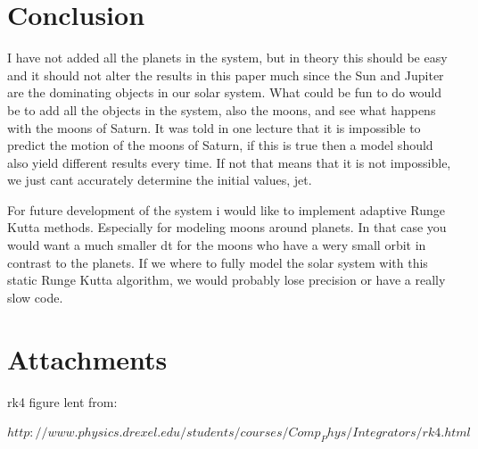 \documentclass[norsk,a4paper,12pt]{article}
\begin{document}
\section*{Conclusion}

I have not added all the planets in the system, but in theory this should be easy and it should not alter the results in this 
paper much since the Sun and Jupiter are the dominating objects in our solar system. What could be fun to do would be to add all
the objects in the system, also the moons, and see what happens with the moons of Saturn. It was told in one lecture that 
it is impossible to predict the motion of the moons of Saturn, if this is true then a model should also yield different results 
every time. If not that means that it is not impossible, we just cant accurately determine the initial values, jet.

For future development of the system i would like to implement adaptive Runge Kutta methods. Especially for modeling moons around
planets. In that case you would want a much smaller dt for the moons who have a wery small orbit in contrast to the planets. If
we where to fully model the solar system with this static Runge Kutta algorithm, we would probably lose precision or have a really 
slow code.





 
\newpage

\section*{Attachments}

rk4 figure lent from:

$http://www.physics.drexel.edu/students/courses/Comp_Phys/Integrators/rk4.html$


%

\end{document}
